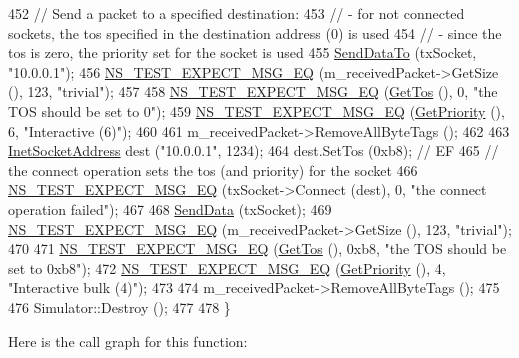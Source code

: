 \begin{DoxyCode}
452   \textcolor{comment}{// Send a packet to a specified destination:}
453   \textcolor{comment}{// - for not connected sockets, the tos specified in the destination address (0) is used}
454   \textcolor{comment}{// - since the tos is zero, the priority set for the socket is used}
455   \hyperlink{classUdpSocketImplTest_a6d164a214837efedad2b6aa32a9fad0e}{SendDataTo} (txSocket, \textcolor{stringliteral}{"10.0.0.1"});
456   \hyperlink{group__testing_ga7304ba46a28d8cf08dfdfd6499cf7068}{NS\_TEST\_EXPECT\_MSG\_EQ} (m\_receivedPacket->GetSize (), 123, \textcolor{stringliteral}{"trivial"});
457 
458   \hyperlink{group__testing_ga7304ba46a28d8cf08dfdfd6499cf7068}{NS\_TEST\_EXPECT\_MSG\_EQ} (\hyperlink{classUdpSocketImplTest_a7afa9bafbaec77d3adca11b4c04df064}{GetTos} (), 0, \textcolor{stringliteral}{"the TOS should be set to 0"});
459   \hyperlink{group__testing_ga7304ba46a28d8cf08dfdfd6499cf7068}{NS\_TEST\_EXPECT\_MSG\_EQ} (\hyperlink{classUdpSocketImplTest_a62f83f508eb6ec572ecda6ab2e43b231}{GetPriority} (), 6, \textcolor{stringliteral}{"Interactive (6)"});
460 
461   m\_receivedPacket->RemoveAllByteTags ();
462 
463   \hyperlink{classns3_1_1InetSocketAddress}{InetSocketAddress} dest (\textcolor{stringliteral}{"10.0.0.1"}, 1234);
464   dest.SetTos (0xb8);  \textcolor{comment}{// EF}
465   \textcolor{comment}{// the connect operation sets the tos (and priority) for the socket}
466   \hyperlink{group__testing_ga7304ba46a28d8cf08dfdfd6499cf7068}{NS\_TEST\_EXPECT\_MSG\_EQ} (txSocket->Connect (dest), 0, \textcolor{stringliteral}{"the connect operation failed"});
467 
468   \hyperlink{classUdpSocketImplTest_a69244de27acf4b1f164091057321b414}{SendData} (txSocket);
469   \hyperlink{group__testing_ga7304ba46a28d8cf08dfdfd6499cf7068}{NS\_TEST\_EXPECT\_MSG\_EQ} (m\_receivedPacket->GetSize (), 123, \textcolor{stringliteral}{"trivial"});
470 
471   \hyperlink{group__testing_ga7304ba46a28d8cf08dfdfd6499cf7068}{NS\_TEST\_EXPECT\_MSG\_EQ} (\hyperlink{classUdpSocketImplTest_a7afa9bafbaec77d3adca11b4c04df064}{GetTos} (), 0xb8, \textcolor{stringliteral}{"the TOS should be set to 0xb8"});
472   \hyperlink{group__testing_ga7304ba46a28d8cf08dfdfd6499cf7068}{NS\_TEST\_EXPECT\_MSG\_EQ} (\hyperlink{classUdpSocketImplTest_a62f83f508eb6ec572ecda6ab2e43b231}{GetPriority} (), 4, \textcolor{stringliteral}{"Interactive bulk (4)"});
473 
474   m\_receivedPacket->RemoveAllByteTags ();
475 
476   Simulator::Destroy ();
477 
478 \}
\end{DoxyCode}


Here is the call graph for this function\+:


